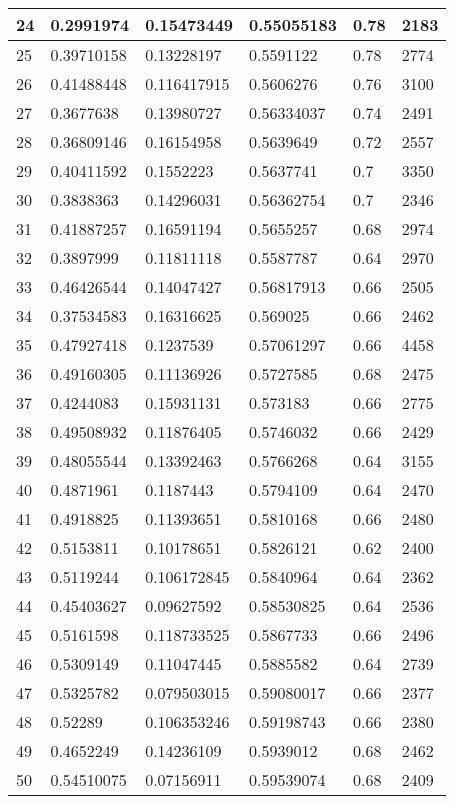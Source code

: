 \begin{longtable}{|l|l|l|l|l|l|}
24 & 0.2991974 & 0.15473449 & 0.55055183 & 0.78 & 2183 \\ \hline 
25 & 0.39710158 & 0.13228197 & 0.5591122 & 0.78 & 2774 \\ \hline 
26 & 0.41488448 & 0.116417915 & 0.5606276 & 0.76 & 3100 \\ \hline 
27 & 0.3677638 & 0.13980727 & 0.56334037 & 0.74 & 2491 \\ \hline 
28 & 0.36809146 & 0.16154958 & 0.5639649 & 0.72 & 2557 \\ \hline 
29 & 0.40411592 & 0.1552223 & 0.5637741 & 0.7 & 3350 \\ \hline 
30 & 0.3838363 & 0.14296031 & 0.56362754 & 0.7 & 2346 \\ \hline 
31 & 0.41887257 & 0.16591194 & 0.5655257 & 0.68 & 2974 \\ \hline 
32 & 0.3897999 & 0.11811118 & 0.5587787 & 0.64 & 2970 \\ \hline 
33 & 0.46426544 & 0.14047427 & 0.56817913 & 0.66 & 2505 \\ \hline 
34 & 0.37534583 & 0.16316625 & 0.569025 & 0.66 & 2462 \\ \hline 
35 & 0.47927418 & 0.1237539 & 0.57061297 & 0.66 & 4458 \\ \hline 
36 & 0.49160305 & 0.11136926 & 0.5727585 & 0.68 & 2475 \\ \hline 
37 & 0.4244083 & 0.15931131 & 0.573183 & 0.66 & 2775 \\ \hline 
38 & 0.49508932 & 0.11876405 & 0.5746032 & 0.66 & 2429 \\ \hline 
39 & 0.48055544 & 0.13392463 & 0.5766268 & 0.64 & 3155 \\ \hline 
40 & 0.4871961 & 0.1187443 & 0.5794109 & 0.64 & 2470 \\ \hline 
41 & 0.4918825 & 0.11393651 & 0.5810168 & 0.66 & 2480 \\ \hline 
42 & 0.5153811 & 0.10178651 & 0.5826121 & 0.62 & 2400 \\ \hline 
43 & 0.5119244 & 0.106172845 & 0.5840964 & 0.64 & 2362 \\ \hline 
44 & 0.45403627 & 0.09627592 & 0.58530825 & 0.64 & 2536 \\ \hline 
45 & 0.5161598 & 0.118733525 & 0.5867733 & 0.66 & 2496 \\ \hline 
46 & 0.5309149 & 0.11047445 & 0.5885582 & 0.64 & 2739 \\ \hline 
47 & 0.5325782 & 0.079503015 & 0.59080017 & 0.66 & 2377 \\ \hline 
48 & 0.52289 & 0.106353246 & 0.59198743 & 0.66 & 2380 \\ \hline 
49 & 0.4652249 & 0.14236109 & 0.5939012 & 0.68 & 2462 \\ \hline 
50 & 0.54510075 & 0.07156911 & 0.59539074 & 0.68 & 2409 \\ \hline 
\end{longtable}